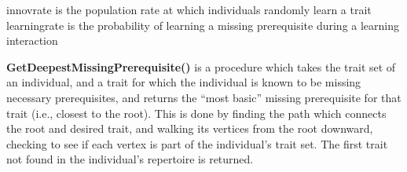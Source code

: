 \begin{algorithm}[H]
	\caption{}
	\label{alg:tree-prereq-axelrod}
	\begin{boxedminipage}{\textwidth}
	\begin{algorithmic}[1]
		\REQUIRE innovrate is the population rate at which individuals randomly learn a trait
		\REQUIRE learningrate is the probability of learning a missing prerequisite during a learning interaction


		\label{alg:ext-first-if}
		\ENDIF



			\ELSE
				\ENDIF
			\ENDIF

		\ENDIF

		\ENDIF

	\end{algorithmic}
	\end{boxedminipage}
\end{algorithm} 

\textbf{GetDeepestMissingPrerequisite()} is a procedure which takes the trait set of an individual, and a trait for which the individual is known to be missing necessary prerequisites, and returns the ``most basic'' missing prerequisite for that trait (i.e., closest to the root). This is done by finding the path which connects the root and desired trait, and walking its vertices from the root downward, checking to see if each vertex is part of the individual's trait set.  The first trait not found in the individual's repertoire is returned.  





